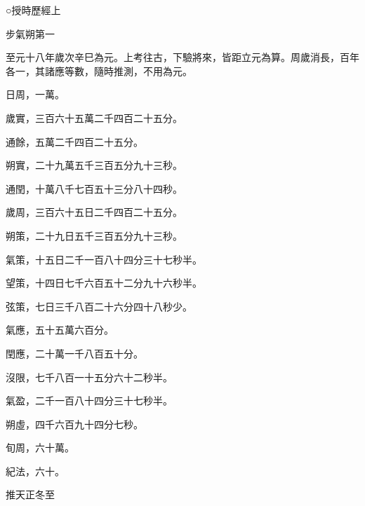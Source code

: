 
\begin{pinyinscope}

 ○授時歷經上



 步氣朔第一



 至元十八年歲次辛巳為元。上考往古，下驗將來，皆距立元為算。周歲消長，百年各一，其諸應等數，隨時推測，不用為元。



 日周，一萬。



 歲實，三百六十五萬二千四百二十五分。



 通餘，五萬二千四百二十五分。



 朔實，二十九萬五千三百五分九十三秒。



 通閏，十萬八千七百五十三分八十四秒。



 歲周，三百六十五日二千四百二十五分。



 朔策，二十九日五千三百五分九十三秒。



 氣策，十五日二千一百八十四分三十七秒半。



 望策，十四日七千六百五十二分九十六秒半。



 弦策，七日三千八百二十六分四十八秒少。



 氣應，五十五萬六百分。



 閏應，二十萬一千八百五十分。



 沒限，七千八百一十五分六十二秒半。



 氣盈，二千一百八十四分三十七秒半。



 朔虛，四千六百九十四分七秒。



 旬周，六十萬。



 紀法，六十。



 推天正冬至




\end{pinyinscope}

